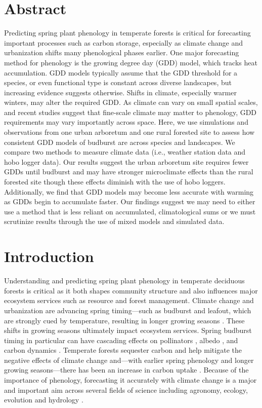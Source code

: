 \documentclass{article}\usepackage[]{graphicx}\usepackage[]{color}
\begin{document}
\section*{Abstract} %
Predicting spring plant phenology in temperate forests is critical for forecasting important processes such as carbon storage, especially as climate change and urbanization shifts many phenological phases earlier. One major forecasting method for phenology is the growing degree day (GDD) model, which tracks heat accumulation. GDD models typically assume that the GDD threshold for a species, or even functional type is constant across diverse landscapes, but increasing evidence suggests otherwise. Shifts in climate, especially warmer winters, may alter the required GDD. As climate can vary on small spatial scales, and recent studies suggest that fine-scale climate may matter to phenology, GDD requirements may vary importantly across space. Here, we use simulations and observations from one urban arboretum and one rural forested site to assess how consistent GDD models of budburst are across species and landscapes. We compare two methods to measure climate data (i.e., weather station data and hobo logger data). Our results suggest the urban arboretum site requires fewer GDDs until budburst and may have stronger microclimate effects than the rural forested site though these effects diminish with the use of hobo loggers. Additionally, we find that GDD models may become less accurate with warming as GDDs begin to accumulate faster. Our findings suggest we may need to either use a method that is less reliant on accumulated, climatological sums or we must scrutinize results through the use of mixed models and simulated data.

\section*{Introduction}

Understanding and predicting spring plant phenology in temperate deciduous forests is critical as it both shapes community structure and also influences major ecosystem services such as resource and forest management. Climate change and urbanization are advancing spring timing---such as budburst and leafout, which are strongly cued by temperature, resulting in longer growing seasons \citep{Chuine2001}. These shifts in growing seasons ultimately impact ecosystem services. Spring budburst timing in particular can have cascading effects on pollinators \citep{Boggs2012, Pardee2017}, albedo \citep{Williamson2016}, and carbon dynamics \citep{Richardson2013}. Temperate forests sequester carbon and help mitigate the negative effects of climate change and---with earlier spring phenology and longer growing seasons---there has been an increase in carbon uptake \citep{Keenan2014}. Because of the importance of phenology, forecasting it accurately with climate change is a major and important aim across several fields of science including agronomy, ecology, evolution and hydrology \citep{Bolton2013,Moorcroft2001,Taylor2020,Yu2016}. 
  
\end{document}
